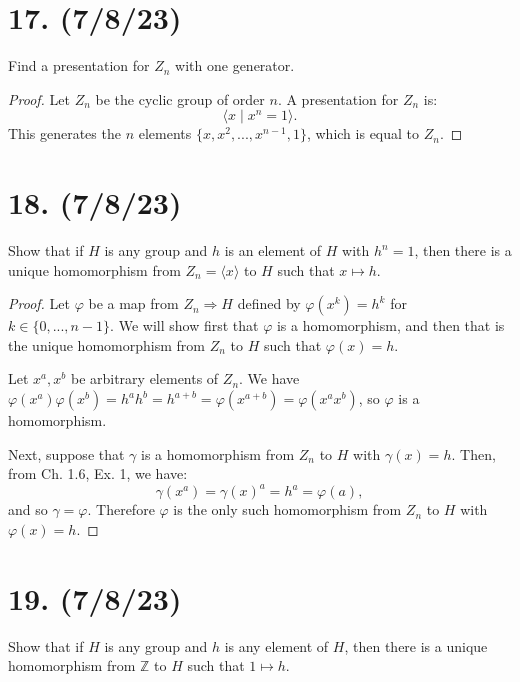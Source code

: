 \documentclass{article}
\begin{document}
\section*{17. (7/8/23)}

Find a presentation for $Z_n$ with one generator.

\begin{proof}
    Let $Z_n$ be the cyclic group of order $n$. A presentation for $Z_n$ is:
    \begin{equation*}\langle x \mid x^n = 1 \rangle.\end{equation*}
    This generates the $n$ elements $\{ x, x^2, ..., x^{n - 1}, 1 \}$, which is equal to $Z_n$.
\end{proof}

\section*{18. (7/8/23)}

Show that if $H$ is any group and $h$ is an element of $H$ with $h^n = 1$, then there is a unique homomorphism from $Z_n = \langle x \rangle$ to $H$ such that $x \mapsto h$.

\begin{proof}
    Let $\varphi$ be a map from $Z_n \Rightarrow H$ defined by $\varphi(x^k) = h^k$ for $k \in \{ 0, ..., n - 1 \}$. We will show first that $\varphi$ is a homomorphism, and then that is the unique homomorphism from $Z_n$ to $H$ such that $\varphi(x) = h$.

    Let $x^a, x^b$ be arbitrary elements of $Z_n$. We have $\varphi(x^a) \varphi(x^b) = h^a h^b = h^{a + b} = \varphi(x^{a + b}) = \varphi(x^a x^b)$, so $\varphi$ is a homomorphism.

    Next, suppose that $\gamma$ is a homomorphism from $Z_n$ to $H$ with $\gamma(x) = h$. Then, from Ch. 1.6, Ex. 1, we have:
    \begin{equation*}
        \gamma(x^a) = \gamma(x)^a = h^a = \varphi(a),
    \end{equation*}
    and so $\gamma = \varphi$. Therefore $\varphi$ is the only such homomorphism from $Z_n$ to $H$ with $\varphi(x) = h$.
\end{proof}

\section*{19. (7/8/23)}

Show that if $H$ is any group and $h$ is any element of $H$, then there is a unique homomorphism from $\mathbb{Z}$ to $H$ such that $1 \mapsto h$.
\end{document}
